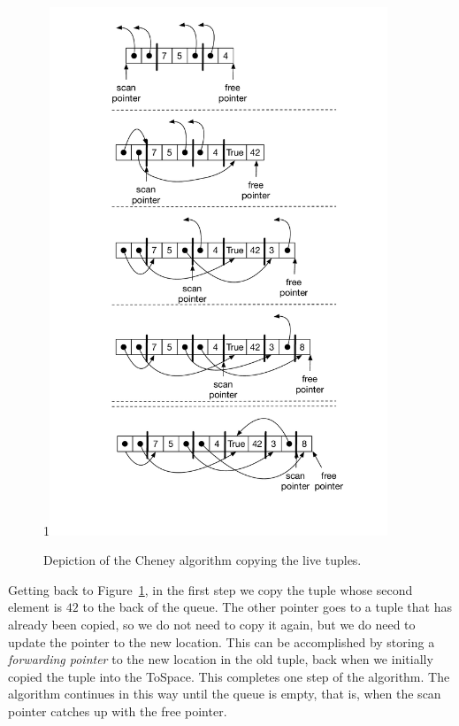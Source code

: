 \documentclass[7x10,nocrop]{TimesAPriori_MIT}%
\def\pythonEd{1}
\def\edition{0}
\newcommand{\python}[1]{{\if\edition\pythonEd #1\fi}}
\begin{document}
\begin{figure}[tbp]
\python{\includegraphics[width=0.9\textwidth]{figs/cheney-python}}
\caption{Depiction of the Cheney algorithm copying the live tuples.}
\label{fig:cheney}
\end{figure}

Getting back to Figure~\ref{fig:cheney}, in the first step we copy the
tuple whose second element is $42$ to the back of the queue. The other
pointer goes to a tuple that has already been copied, so we do not
need to copy it again, but we do need to update the pointer to the new
location. This can be accomplished by storing a \emph{forwarding
pointer} to the new location in the
old tuple, back when we initially copied the tuple into the
ToSpace. This completes one step of the algorithm. The algorithm
continues in this way until the queue is empty, that is, when the scan
pointer catches up with the free pointer.
\end{document}
